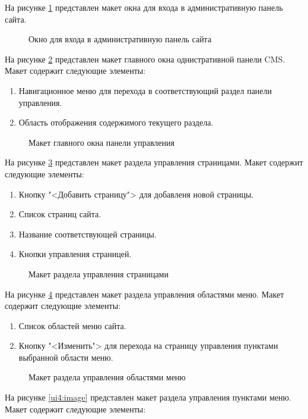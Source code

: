 На рисунке \ref{ui6:image} представлен макет окна для входа в административную панель сайта.
\begin{figure}[H]
	\center{\texttt{[image: ui6]}}
	\caption{Окно для входа в административную панель сайта}
	\label{ui6:image}
\end{figure}

На рисунке \ref{ui1:image} представлен макет главного окна однистративной панели CMS. Макет содержит следующие элементы:
\begin{enumerate}
	\item Навигационное меню для перехода в соответствующий раздел панели управления.
	\item Область отображения содержимого текущего раздела.
\end{enumerate}
\begin{figure}[H]
	\center{\texttt{[image: ui1]}}
	\caption{Макет главного окна панели управления}
	\label{ui1:image}
\end{figure}
На рисунке \ref{ui2:image} представлен макет раздела управления страницами. Макет содержит следующие элементы:
\begin{enumerate}
	\item Кнопку "<Добавить страницу"> для добавленя новой страницы.
	\item Список страниц сайта.
	\item Название соответствующей страницы.
	\item Кнопки управления страницей.
\end{enumerate}
\begin{figure}[H]
	\center{\texttt{[image: ui2]}}
	\caption{Макет раздела управления страницами}
	\label{ui2:image}
\end{figure}
На рисунке \ref{ui3:image} представлен макет раздела управления областями меню. Макет содержит следующие элементы:
\begin{enumerate}
	\item Список областей меню сайта.
	\item Кнопку "<Изменить"> для перехода на страницу управления пунктами выбранной области меню.
\end{enumerate}
\begin{figure}[H]
	\center{\texttt{[image: ui3]}}
	\caption{Макет раздела управления областями меню}
	\label{ui3:image}
\end{figure}
На рисунке \ref{ui4:image} представлен макет раздела управления пунктами меню. Макет содержит следующие элементы:
